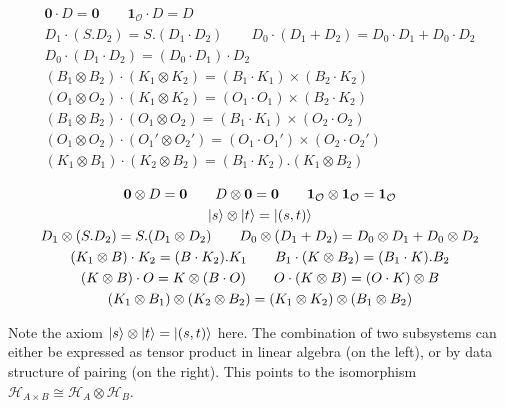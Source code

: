 \documentclass[manuscript, review, timestamp]{acmart}
\begin{document}
\begin{definition}
  \begin{gather*}
      \textbf{0} \cdot D = \textbf{0}
      \qquad
      \textbf{1}_\mathcal{O} \cdot D = D \\
      D_1 \cdot (S.D_2) = S.(D_1 \cdot D_2)
      \qquad
      D_0 \cdot (D_1 + D_2) = D_0 \cdot D_1 + D_0 \cdot D_2 \\
      D_0 \cdot (D_1 \cdot D_2) = (D_0 \cdot D_1) \cdot D_2 \\
      (B_1 \otimes B_2) \cdot (K_1 \otimes K_2) = (B_1 \cdot K_1) \times (B_2 \cdot K_2) \\
      (O_1 \otimes O_2) \cdot (K_1 \otimes K_2) = (O_1 \cdot O_1) \times (B_2 \cdot K_2) \\
      (B_1 \otimes B_2) \cdot (O_1 \otimes O_2) = (B_1 \cdot K_1) \times (O_2 \cdot O_2) \\
      (O_1 \otimes O_2) \cdot (O_1' \otimes O_2') = (O_1 \cdot O_1') \times (O_2 \cdot O_2') \\
      (K_1 \otimes B_1) \cdot (K_2 \otimes B_2) = (B_1 \cdot K_2) . (K_1 \otimes B_2)
  \end{gather*}
\end{definition}


\begin{definition}
  \begin{gather*}
      \mathbf{0} \otimes D = \mathbf{0}
      \qquad
      D \otimes \mathbf{0} = \mathbf{0}
      \qquad
      \mathbf{1}_\mathcal{O} \otimes \mathbf{1}_\mathcal{O} = \mathbf{1}_\mathcal{O} \\
      \ket{s} \otimes \ket{t} =\ket{(s, t)} \\
      D_1 \otimes (S.D_2) = S.(D_1 \otimes D_2)
      \qquad
      D_0 \otimes (D_1 + D_2) = D_0 \otimes D_1 + D_0 \otimes D_2 \\
      (K_1 \otimes B) \cdot K_2 = (B \cdot K_2).K_1
      \qquad
      B_1 \cdot (K \otimes B_2) = (B_1 \cdot K).B_2 \\
      (K \otimes B) \cdot O = K \otimes (B \cdot O)
      \qquad
      O \cdot (K \otimes B) = (O \cdot K) \otimes B \\
      (K_1 \otimes B_1) \otimes (K_2 \otimes B_2) = (K_1 \otimes K_2) \otimes (B_1 \otimes B_2) \\
  \end{gather*}
\end{definition}

Note the axiom $\ket{s} \otimes \ket{t} =\ket{(s, t)}$ here. The combination of two subsystems can either be expressed as tensor product in linear algebra (on the left), or by data structure of pairing (on the right). This points to the isomorphism $\mathcal{H}_{A \times B} \cong \mathcal{H}_A \otimes \mathcal{H}_B$.
\end{document}
